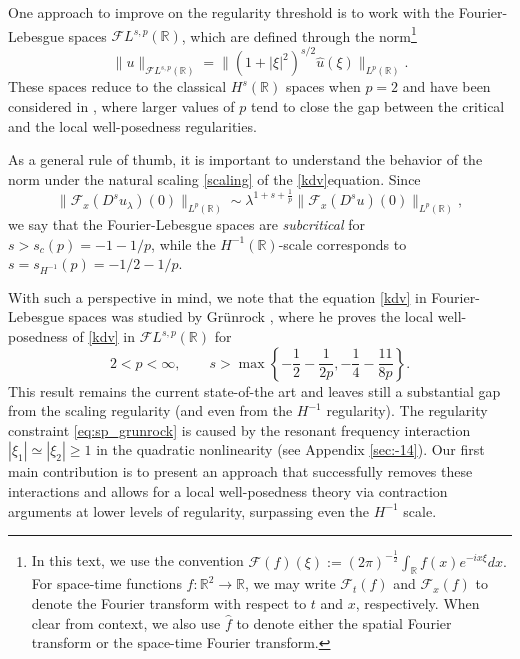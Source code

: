 \documentclass[%
11pt,  reqno]{amsart}
\newcommand{\5}{\textup{V}}
\newcommand{\FL}{\mathcal{F} L}
\newcommand{\ft}{\widehat}
\newcommand{\F}{\mathcal{F}}
\newcommand{\jp}{\color{orange}}
\theoremstyle{remark}
\newcommand{\R}{\mathbb{R}}
\newcommand{\Ft}{{\mathcal{F}}}
\numberwithin{equation}{section}
\numberwithin{theorem}{section}
\begin{document}
\medskip

One approach to improve on the regularity threshold is to work with the Fourier-Lebesgue spaces $\mathcal{F}L^{s,p}(\R)$, which are defined through the norm\footnote{
In this text, we use the convention
$
 \Ft(f)(\xi) := (2\pi)^{-\frac12} \int_\R f(x) e^{-i x \xi} dx. 
$
For space-time functions $f: \R^2 \to \R$, we may write $\Ft_t (f)$ and $\Ft_x(f)$ to denote the Fourier transform with respect to $t$ and $x$, respectively. When clear from context, we also use $\ft{f}$ to denote either the spatial Fourier transform or the space-time Fourier transform. }
	\begin{equation}
		\|u\|_{\FL^{s,p}(\R)}=\|(1+|\xi|^2)^{s/2}\ft{u}(\xi)\|_{L^p(\R)}.
	\end{equation} 
These spaces reduce to the classical $H^s(\R)$ spaces when $p=2$ and have been considered in \cite{adams, Chapouto_FL_mkdv, CC24, Grunrock_ldv_hier, HerrGrunrock_FL,  GrunrockVega}, where larger values of $p$ tend to close the gap between the critical and the local well-posedness regularities. 

As a general rule of thumb, it is important to understand the behavior of the norm under the natural scaling \eqref{scaling} of the \eqref{kdv}equation.
Since 
$$\|\F_x(D^su_\lambda)(0)\|_{L^p(\R)} \sim \lambda^{1+s+\frac1p}\|\F_x(D^su)(0)\|_{L^p(\R)}, $$ we say that the Fourier-Lebesgue spaces are \emph{subcritical} for $s>s_c(p)=-1-1/p$, while the $H^{-1}(\R)$-scale corresponds to $s=s_{H^{-1}}(p)=-1/2-1/p$.

{\jp With such a perspective in mind, we note that the equation} \eqref{kdv} in Fourier-Lebesgue spaces was studied by Grünrock \cite{Grunrock_ldv_hier},  where he proves the local well-posedness of \eqref{kdv} in $\mathcal{F}L^{s,p}(\R)$ for
	\begin{equation}
		2<p<\infty,\qquad s>\max\left\{ -\frac12 - \frac{1}{2p}, -\frac14 - \frac{11}{8p} \right\}.\label{eq:sp_grunrock}
	\end{equation}
This result remains the current state-of-the art and leaves still a substantial gap from the scaling regularity  (and even from the $H^{-1}$ regularity). The regularity constraint \eqref{eq:sp_grunrock} is caused by the resonant frequency interaction $|\xi_1|\simeq |\xi_2|\ge 1$ in the quadratic nonlinearity (see Appendix \ref{sec:-14}). Our first main contribution is to present an approach that successfully removes these interactions and allows for a local well-posedness theory via contraction arguments at lower levels of regularity, surpassing even the $H^{-1}$ scale.
\end{document}

